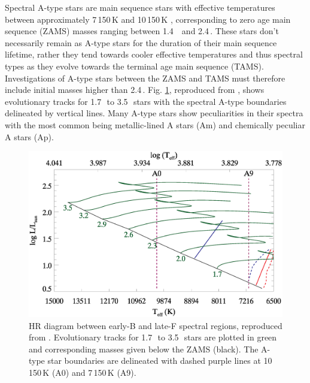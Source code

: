 Spectral A-type stars are main sequence stars with effective temperatures between approximately 7\,150\,K and 10\,150\,K \citep{murphy_kepler_2012}, corresponding to zero age main sequence (ZAMS) masses ranging between 1.4\,\Msol~ and 2.4\,\Msol. These stars don't necessarily remain as A-type stars for the duration of their main sequence lifetime, rather they tend towards cooler effective temperatures and thus spectral types as they evolve towards the terminal age main sequence (TAMS). Investigations of A-type stars between the ZAMS and TAMS must therefore include initial masses higher than 2.4\,\Msol. Fig. \ref{fig:Astar_evol_tracks}, reproduced from \citet{murphy_examination_2012}, shows evolutionary tracks for 1.7\,\Msol~to 3.5\,\Msol~stars with the spectral A-type boundaries delineated by vertical lines. Many A-type stars show peculiarities in their spectra with the most common being metallic-lined A stars (Am) and chemically peculiar A stars (Ap). 
\pagebreak
\begin{figure}[!h]
    \centering
    \includegraphics[width=\linewidth]{Chapter3/A_star_HR_delimited.eps}
    \caption[HR diagram with evolutionary tracks of A-type stars]{HR diagram between early-B and late-F spectral regions, reproduced from \citet{murphy_examination_2012}. Evolutionary tracks for 1.7\,\Msol~to 3.5\,\Msol~stars are plotted in green and corresponding masses given below the ZAMS (black). The A-type star boundaries are delineated with dashed purple lines at 10\,150\,K (A0) and 7\,150\,K (A9).}
    \label{fig:Astar_evol_tracks}
\end{figure}


